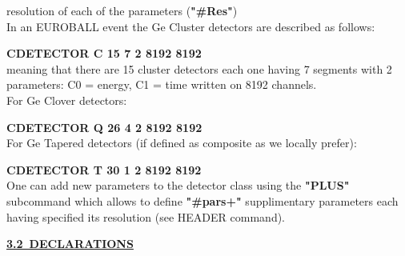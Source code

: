 \begin{itemize}
	\hskip0.5cm resolution of each of the parameters ({\bf "\#Res"})\\

	In an EUROBALL event the Ge Cluster detectors are described as 
	follows:

	\hskip1cm {\bf CDETECTOR C 15 7 2 8192 8192} \\
	meaning that there are 15 cluster detectors each one having
	7 segments with 2 parameters: C0 = energy, C1 = time 
	written on 8192 channels. \\
	For Ge Clover detectors:

	\hskip1cm {\bf CDETECTOR Q 26 4 2 8192 8192} \\
	For Ge Tapered detectors (if defined as composite as we locally 
	prefer):

	\hskip1cm {\bf CDETECTOR T 30 1 2 8192 8192} \\

	One can add new parameters to the detector class using
	the {\bf "PLUS"} subcommand which allows to define {\bf "\#pars+"}
	supplimentary parameters each having specified its resolution
	(see HEADER command).
\end{itemize}

\newpage

{\large\underline{\bf 3.2~DECLARATIONS}} \\

